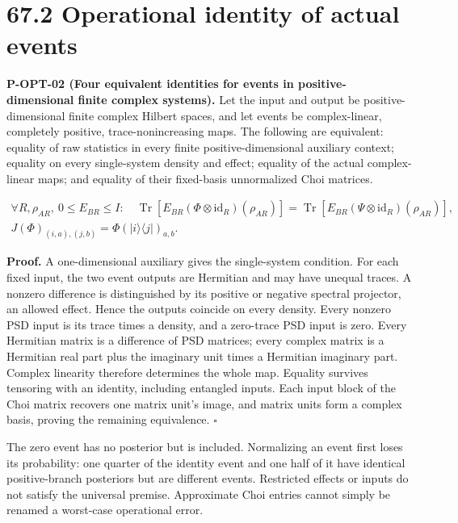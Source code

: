 \documentclass[
  11pt,
  oneside]{book}
\begin{document}
\section{67.2 Operational identity of actual events}

\label{p-opt-02}{}

\textbf{P-OPT-02 (Four equivalent identities for events in
positive-dimensional finite complex systems).} Let the input and output
be positive-dimensional finite complex Hilbert spaces, and let events be
complex-linear, completely positive, trace-nonincreasing maps. The
following are equivalent: equality of raw statistics in every finite
positive-dimensional auxiliary context; equality on every single-system
density and effect; equality of the actual complex-linear maps; and
equality of their fixed-basis unnormalized Choi matrices.

\[
\begin{gathered}
\forall R,\rho_{AR},\ 0\le E_{BR}\le I:\quad
\operatorname{Tr}\!\left[E_{BR}(\Phi\otimes\mathrm{id}_R)(\rho_{AR})\right]
=\operatorname{Tr}\!\left[E_{BR}(\Psi\otimes\mathrm{id}_R)(\rho_{AR})\right],\\
J(\Phi)_{(i,a),(j,b)}=\Phi(|i\rangle\langle j|)_{a,b}.
\end{gathered}
\]

\textbf{Proof.} A one-dimensional auxiliary gives the single-system
condition. For each fixed input, the two event outputs are Hermitian and
may have unequal traces. A nonzero difference is distinguished by its
positive or negative spectral projector, an allowed effect. Hence the
outputs coincide on every density. Every nonzero PSD input is its trace
times a density, and a zero-trace PSD input is zero. Every Hermitian
matrix is a difference of PSD matrices; every complex matrix is a
Hermitian real part plus the imaginary unit times a Hermitian imaginary
part. Complex linearity therefore determines the whole map. Equality
survives tensoring with an identity, including entangled inputs. Each
input block of the Choi matrix recovers one matrix unit's image, and
matrix units form a complex basis, proving the remaining equivalence.
\(\square\)

The zero event has no posterior but is included. Normalizing an event
first loses its probability: one quarter of the identity event and one
half of it have identical positive-branch posteriors but are different
events. Restricted effects or inputs do not satisfy the universal
premise. Approximate Choi entries cannot simply be renamed a worst-case
operational error.
\end{document}
